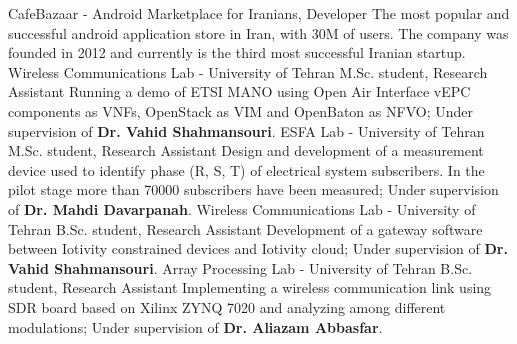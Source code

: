{}
{CafeBazaar - Android Marketplace for Iranians,}
{Developer}
{
  The most popular and successful android application store in Iran, with 30M of users. The company
was founded in 2012 and currently is the third most successful Iranian startup.
}
{}
{Wireless Communications Lab - University of Tehran}
{M.Sc. student, Research Assistant}
{
  Running a demo of ETSI MANO using Open Air Interface vEPC components as VNFs, OpenStack as VIM and OpenBaton as NFVO;
  Under supervision of \textbf{Dr. Vahid Shahmansouri}.
}
\medskip
{}
{}
{ESFA Lab - University of Tehran}
{M.Sc. student, Research Assistant}
{
  Design and development of a measurement device used to identify phase (R, S, T) of electrical system subscribers.
  In the pilot stage more than 70000 subscribers have been measured;
  Under supervision of \textbf{Dr. Mahdi Davarpanah}.
}
\medskip
{}
{}
{Wireless Communications Lab - University of Tehran}
{B.Sc. student, Research Assistant}
{
  Development of a gateway software between Iotivity constrained devices and Iotivity cloud;
  Under supervision of \textbf{Dr. Vahid Shahmansouri}.
}
\medskip
{}
{}
{Array Processing Lab - University of Tehran}
{B.Sc. student, Research Assistant}
{
  Implementing a wireless communication link using SDR board based on Xilinx ZYNQ 7020 and analyzing among different modulations;
  Under supervision of \textbf{Dr. Aliazam Abbasfar}.
}
\medskip
